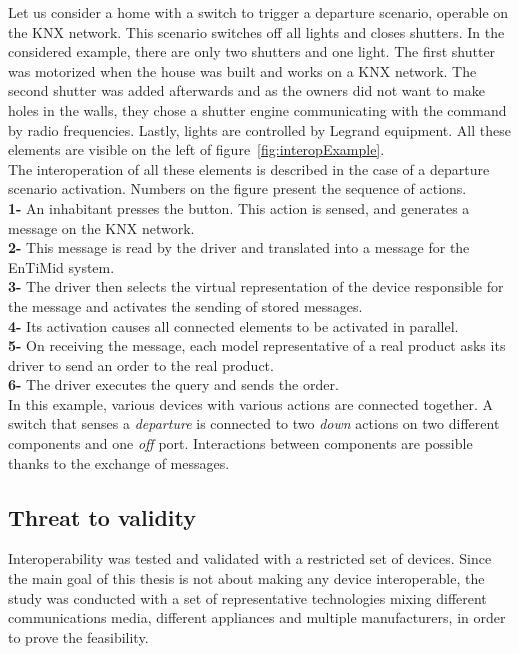 Let us consider a home with a switch to trigger a departure scenario, operable on the KNX network. This scenario switches off all lights and closes shutters. In the considered example, there are only two shutters and one light. The first shutter was motorized when the house was built and works on a KNX network. The second shutter was added afterwards and as the owners did not want to make holes in the walls, they chose a shutter engine communicating with the command by radio frequencies. Lastly, lights are controlled by Legrand equipment. All these elements are visible on the left of figure~\ref{fig:interopExample}.\\
The interoperation of all these elements is described in the case of a departure scenario activation. Numbers on the figure present the sequence of actions.\\
{\bf 1-} An inhabitant presses the button. This action is sensed, and generates a message on the KNX network.\\
{\bf 2-} This message is read by the driver and translated into a message for the EnTiMid system.\\
{\bf 3-} The driver then selects the virtual representation of the device responsible for the message and activates the sending of stored messages.\\
{\bf 4-} Its activation causes all connected elements to be activated in parallel.\\
{\bf 5-} On receiving the message, each model representative of a real product asks its driver to send an order to the real product.\\
{\bf 6-} The driver executes the query and sends the order.\\
In this example, various devices with various actions are connected together. A switch that senses a {\it departure} is connected to two {\it down} actions on two different components and one {\it off} port. Interactions between components are possible thanks to the exchange of messages.\\

\subsection{Threat to validity}
Interoperability was tested and validated with a restricted set of devices. Since the main goal of this thesis is not about making any device interoperable, the study was conducted with a set of representative technologies mixing different communications media, different appliances and multiple manufacturers, in order to prove the feasibility. 

